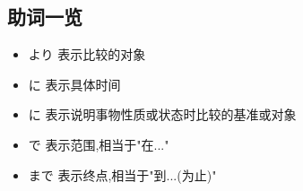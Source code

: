     \subsection{助词一览}
        \begin{itemize}
            \item より 表示比较的对象
            \item に 表示具体时间
            \item に 表示说明事物性质或状态时比较的基准或对象
            \item で 表示范围,相当于"在..."
            \item まで 表示终点,相当于"到...(为止)"
        \end{itemize}

